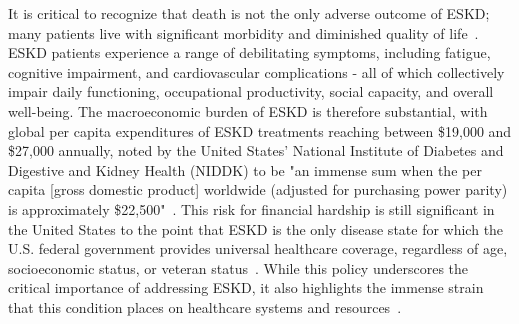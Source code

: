 It is critical to recognize that death is not the only adverse outcome of ESKD; many patients live with significant morbidity and diminished quality of life~\cite{nayana_cross_2017}. ESKD patients experience a range of debilitating symptoms, including fatigue, cognitive impairment, and cardiovascular complications - all of which collectively impair daily functioning, occupational productivity, social capacity, and overall well-being. The macroeconomic burden of ESKD is therefore substantial, with global per capita expenditures of ESKD treatments reaching between \$19,000 and \$27,000 annually, noted by the United States' National Institute of Diabetes and Digestive and Kidney Health (NIDDK) to be "an immense sum when the per capita [gross domestic product] worldwide (adjusted for purchasing power parity) is approximately \$22,500"~\cite{unitedstatesrenaldatasystem_USRDS_2025}. This risk for financial hardship is still significant in the United States to the point that ESKD is the only disease state for which the U.S. federal government provides universal healthcare coverage, regardless of age, socioeconomic status, or veteran status~\cite{centerformedicareandmedicaidservices_EndStage_2024}. While this policy underscores the critical importance of addressing ESKD, it also highlights the immense strain that this condition places on healthcare systems and resources~\cite{unitedstatesrenaldatasystem_USRDS_2025,gupta_Epidemiology_2021}.


